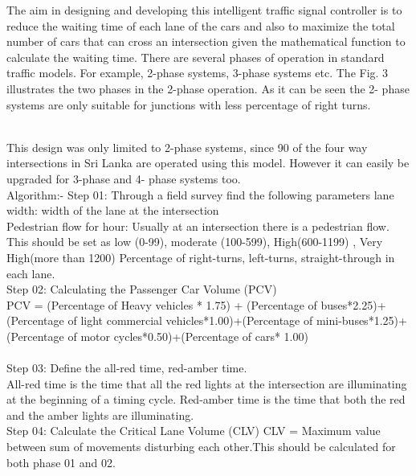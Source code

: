 \documentclass{SureshLimkar}
\begin{document}
\hspace {0.5 in}The aim in designing and developing this intelligent traffic signal controller is to reduce the waiting time of each lane of the cars and also to maximize the total number of cars that can cross an intersection given the mathematical function to calculate the waiting time. There are several phases of operation in standard traffic models.  For example, 2-phase systems, 3-phase systems etc. The Fig. 3 illustrates the two phases in the 2-phase operation.  As it can be seen the 2- phase systems are only suitable for junctions with less percentage of right turns. \\
\begin{figure}[h]%
\centering
{}%
\end{figure}
\\
\hspace{0.5 in}This design was only limited to 2-phase systems, since 90 of the four way intersections in Sri Lanka are operated using this model. However it can easily be upgraded for 3-phase and 4- phase systems too.\\
\hspace Algorithm:- Step 01: Through a field survey find the following parameters
lane width: width of the lane at the intersection\\
\hspace Pedestrian flow for hour: Usually at an intersection there is a pedestrian flow. This should be set as low (0-99), moderate (100-599), High(600-1199) , Very High(more than 1200) 
\hspace Percentage of right-turns, left-turns, straight-through in each lane. \\
\hspace Step 02: Calculating the Passenger Car Volume (PCV)\\
\hspace PCV = (Percentage of Heavy vehicles * 1.75) + (Percentage of buses*2.25)+(Percentage of light commercial vehicles*1.00)+(Percentage of mini-buses*1.25)+(Percentage of motor cycles*0.50)+(Percentage of cars*  1.00)\\
\newpage\\
\hspace Step 03: Define the all-red time, red-amber time.\\ 
\hspace All-red time is the time that all the red lights at the intersection are illuminating at the beginning of a timing cycle. Red-amber time is the time that both the red and the amber lights are illuminating.\\
\hspace Step 04: Calculate the Critical Lane Volume (CLV) CLV = Maximum value between sum of movements disturbing each other.This should be calculated for both phase 01 and 02.\\
\end{document}
